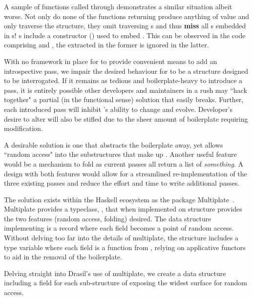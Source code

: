 A sample of functions called through  demonstrates a similar situation albeit worse. Not only do none of the functions returning \haskell{[Expr]} produce anything of value and only traverse the structure, they omit traversing s and thus \textbf{miss} all s embedded in s! s include a constructor () used to embed . This can be observed in the code comprising  and , the  extracted in the former is ignored in the latter.

With no framework in place for  to provide convenient means to add an introspective pass, we impair the desired behaviour for  to be a structure designed to be interrogated. If it remains as tedious and boilerplate-heavy to introduce a pass, it is entirely possible other developers and maintainers in a rush may ``hack together" a partial (in the functional sense) solution that easily breaks. Further, each introduced pass will inhibit 's ability to change and evolve. Developer's desire to alter  will also be stifled due to the sheer amount of boilerplate requiring modification.

A desirable solution is one that abstracts the boilerplate away, yet allows ``random access" into the substructures that make up . Another useful feature would be a mechanism to fold  as current passes all return a list of \textit{something}. A design with both features would allow for a streamlined re-implementation of the three existing passes and reduce the effort and time to write additional passes. 

The solution exists within the Haskell ecosystem as the package Multiplate~\cite{multiplate}. Multiplate provides a typeclass, , that when implemented on structure provides the two features (random access, folding) desired. The data structure implementing  is a record where each field becomes a point of random access. Without delving too far into the details of multiplate, the structure includes a type variable  where each field is a function from   , relying on applicative functors to aid in the removal of the boilerplate.

Delving straight into Drasil's use of multiplate, we create a data structure  including a field for each sub-structure of  exposing the widest surface for random access.

